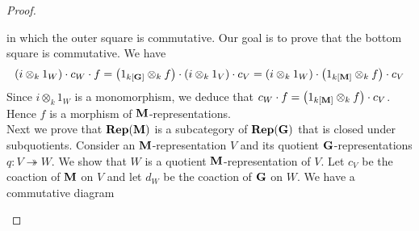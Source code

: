 \begin{proof}
\begin{center}
\end{center}
in which the outer square is commutative. Our goal is to prove that the bottom square is commutative. We have
$$\left(i\otimes_k1_W\right) \cdot c_W\cdot f = \left(1_{k[\mathbf{G}]} \otimes_k f\right)\cdot \left(i\otimes_k1_V\right) \cdot c_V = \left(i\otimes_k1_W\right) \cdot \left(1_{k[\mathbf{M}]} \otimes_k f\right) \cdot  c_V$$
Since $i\otimes_k1_W$ is a monomorphism, we deduce that $c_W\cdot f = \left(1_{k[\mathbf{M}]} \otimes_k f\right) \cdot c_V$. Hence $f$ is a morphism of $\mathbf{M}$-representations.\\
Next we prove that $\mathbf{Rep}(\mathbf{M})$ is a subcategory of $\mathbf{Rep}(\mathbf{G})$ that is closed under subquotients. Consider an $\mathbf{M}$-representation $V$ and its quotient $\mathbf{G}$-representations $q:V\twoheadrightarrow W$. We show that $W$ is a quotient $\mathbf{M}$-representation of $V$. Let $c_V$ be the coaction of $\mathbf{M}$ on $V$ and let $d_W$ be the coaction of $\mathbf{G}$ on $W$. We have a commutative diagram
\begin{center}
\end{center}
\end{proof}
